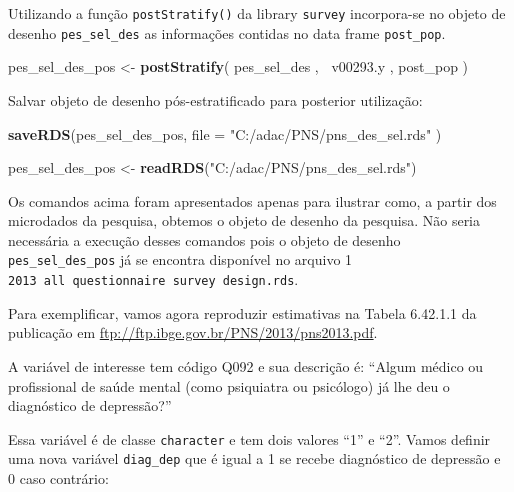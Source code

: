\documentclass[]{book}
\newenvironment{Shaded}{\begin{snugshade}}{\end{snugshade}}
\newcommand{\KeywordTok}[1]{\textcolor[rgb]{0.13,0.29,0.53}{\textbf{#1}}}
\newcommand{\DataTypeTok}[1]{\textcolor[rgb]{0.13,0.29,0.53}{#1}}
\newcommand{\StringTok}[1]{\textcolor[rgb]{0.31,0.60,0.02}{#1}}
\newcommand{\OperatorTok}[1]{\textcolor[rgb]{0.81,0.36,0.00}{\textbf{#1}}}
\newcommand{\NormalTok}[1]{#1}
\theoremstyle{definition}
\theoremstyle{definition}
\theoremstyle{definition}
\theoremstyle{remark}
\begin{document}
Utilizando a função \texttt{postStratify()} da library \texttt{survey}
\citep{R-survey} incorpora-se no objeto de desenho
\texttt{pes\_sel\_des} as informações contidas no data frame
\texttt{post\_pop}.

\begin{Shaded}
\begin{Highlighting}[]
\NormalTok{pes_sel_des_pos <-}\StringTok{ }\KeywordTok{postStratify}\NormalTok{( pes_sel_des , }\OperatorTok{~}\NormalTok{v00293.y , post_pop )}
\end{Highlighting}
\end{Shaded}

Salvar objeto de desenho pós-estratificado para posterior utilização:

\begin{Shaded}
\begin{Highlighting}[]
\KeywordTok{saveRDS}\NormalTok{(pes_sel_des_pos, }\DataTypeTok{file =} \StringTok{"C:/adac/PNS/pns_des_sel.rds"}\NormalTok{ )}
\end{Highlighting}
\end{Shaded}

\begin{Shaded}
\begin{Highlighting}[]
\NormalTok{pes_sel_des_pos <-}\StringTok{ }\KeywordTok{readRDS}\NormalTok{(}\StringTok{"C:/adac/PNS/pns_des_sel.rds"}\NormalTok{)}
\end{Highlighting}
\end{Shaded}

Os comandos acima foram apresentados apenas para ilustrar como, a partir
dos microdados da pesquisa, obtemos o objeto de desenho da pesquisa. Não
seria necessária a execução desses comandos pois o objeto de desenho
\texttt{pes\_sel\_des\_pos} já se encontra disponível no arquivo 1
\texttt{2013\ all\ questionnaire\ survey\ design.rds}.

Para exemplificar, vamos agora reproduzir estimativas na Tabela 6.42.1.1
da publicação em \url{ftp://ftp.ibge.gov.br/PNS/2013/pns2013.pdf}.

A variável de interesse tem código Q092 e sua descrição é: ``Algum
médico ou profissional de saúde mental (como psiquiatra ou psicólogo) já
lhe deu o diagnóstico de depressão?''

Essa variável é de classe \texttt{character} e tem dois valores ``1'' e
``2''. Vamos definir uma nova variável \texttt{diag\_dep} que é igual a
1 se recebe diagnóstico de depressão e 0 caso contrário:

\begin{Shaded}
\end{Shaded}
\end{document}
